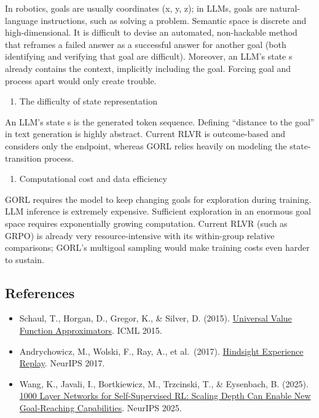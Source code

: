 In robotics, goals are usually coordinates (x, y, z); in LLMs, goals are natural-language instructions, such as solving a problem. Semantic space is discrete and high-dimensional. It is difficult to devise an automated, non-hackable method that reframes a failed answer as a successful answer for another goal (both identifying and verifying that goal are difficult). Moreover, an LLM's state s already contains the context, implicitly including the goal. Forcing goal and process apart would only create trouble.

\begin{enumerate}
\def\labelenumi{\arabic{enumi}.}
\setcounter{enumi}{1}
\tightlist
\item
  The difficulty of state representation
\end{enumerate}

An LLM's state s is the generated token sequence. Defining ``distance to the goal'' in text generation is highly abstract. Current RLVR is outcome-based and considers only the endpoint, whereas GORL relies heavily on modeling the state-transition process.

\begin{enumerate}
\def\labelenumi{\arabic{enumi}.}
\setcounter{enumi}{2}
\tightlist
\item
  Computational cost and data efficiency
\end{enumerate}

GORL requires the model to keep changing goals for exploration during training. LLM inference is extremely expensive. Sufficient exploration in an enormous goal space requires exponentially growing computation. Current RLVR (such as GRPO) is already very resource-intensive with its within-group relative comparisons; GORL's multigoal sampling would make training costs even harder to sustain.

\FloatBarrier
{}
\hypertarget{references-66}{%
\subsection{References}\label{references-66}}

\vspace{0.25em}
\begin{itemize}
\tightlist
\item
  Schaul, T., Horgan, D., Gregor, K., \& Silver, D. (2015). \href{https://proceedings.mlr.press/v37/schaul15.html}{Universal Value Function Approximators}. ICML 2015.
\item
  Andrychowicz, M., Wolski, F., Ray, A., et al.~(2017). \href{https://arxiv.org/abs/1707.01495}{Hindsight Experience Replay}. NeurIPS 2017.
\item
  Wang, K., Javali, I., Bortkiewicz, M., Trzcinski, T., \& Eysenbach, B. (2025). \href{https://proceedings.neurips.cc/paper_files/paper/2025/hash/e74ee34cc0f2d0780f34ee77d8fba25b-Abstract-Conference.html}{1000 Layer Networks for Self-Supervised RL: Scaling Depth Can Enable New Goal-Reaching Capabilities}. NeurIPS 2025.
\end{itemize}

\clearpage
